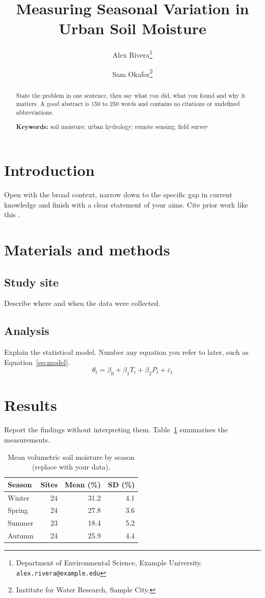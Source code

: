 \documentclass[11pt,a4paper]{article}
\title{\textbf{Measuring Seasonal Variation in Urban Soil Moisture}}
\author{Alex Rivera\thanks{Department of Environmental Science, Example University. \texttt{alex.rivera@example.edu}}
  \and Sam Okafor\thanks{Institute for Water Research, Sample City.}}
\date{}
\newcommand{\keywords}[1]{\par\medskip\noindent\textbf{Keywords:} #1}
\begin{document}
\maketitle

\begin{abstract}
\noindent State the problem in one sentence, then say what you did, what you found and why it matters.
A good abstract is 150 to 250 words and contains no citations or undefined abbreviations.
\keywords{soil moisture; urban hydrology; remote sensing; field survey}
\end{abstract}

\section{Introduction}
\label{sec:intro}
Open with the broad context, narrow down to the specific gap in current knowledge and finish with a clear statement of your aims.
Cite prior work like this \citep{doe2021,lee2019}.

\section{Materials and methods}
\label{sec:methods}
\subsection{Study site}
Describe where and when the data were collected.

\subsection{Analysis}
Explain the statistical model. Number any equation you refer to later, such as Equation~\eqref{eq:model}.
\begin{equation}
  \theta_t = \beta_0 + \beta_1 T_t + \beta_2 P_t + \varepsilon_t
  \label{eq:model}
\end{equation}

\section{Results}
\label{sec:results}
Report the findings without interpreting them. Table~\ref{tab:summary} summarises the measurements.

\begin{table}[ht]
  \centering
  \caption{Mean volumetric soil moisture by season (replace with your data).}
  \label{tab:summary}
  \begin{tabular}{lrrr}
    \toprule
    Season & Sites & Mean (\%) & SD (\%) \\
    \midrule
    Winter & 24 & 31.2 & 4.1 \\
    Spring & 24 & 27.8 & 3.6 \\
    Summer & 23 & 18.4 & 5.2 \\
    Autumn & 24 & 25.9 & 4.4 \\
    \bottomrule
  \end{tabular}
\end{table}
\end{document}
